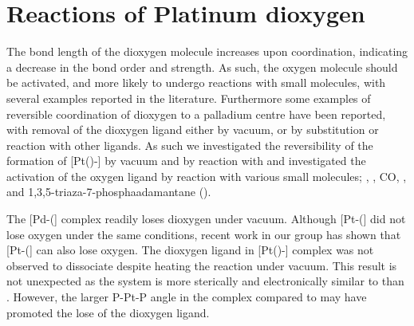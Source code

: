 %



\section{Reactions of Platinum dioxygen}

The bond length of the dioxygen molecule increases upon coordination, indicating a decrease in the bond order and strength.  As such, the oxygen molecule should be activated, and more likely to undergo reactions with small molecules, with several examples reported in the literature.  Furthermore some examples of reversible coordination of dioxygen to a palladium centre have been reported, with removal of the dioxygen ligand either by vacuum, or by substitution or reaction with other ligands.  As such we investigated the reversibility of the formation of [Pt(\tButhixantphos)\hapto{}-] by vacuum and by reaction with  and investigated the activation of the oxygen ligand by reaction with various small molecules; , , CO, ,  and 1,3,5-triaza-7-phosphaadamantane ().

The [Pd\hapto{}-(] complex readily loses dioxygen under vacuum.\cite{Yoshida1979} Although [Pt\hapto{}-(] did not lose oxygen under the same conditions, recent work in our group has shown that [Pt\hapto{}-(]  can also lose oxygen.  The dioxygen ligand in [Pt(\tButhixantphos)\hapto{}-] complex was not observed to dissociate despite heating the reaction under vacuum.  This result is not unexpected as the \tButhixantphos{} system is more sterically and electronically similar to  than .  However, the larger P-Pt-P angle in the \tButhixantphos{} complex compared to  may have promoted the lose of the dioxygen ligand.  

